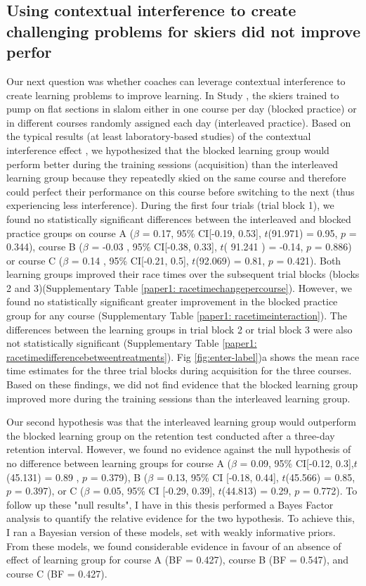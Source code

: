 \subsection{Using contextual interference to create challenging problems for skiers did not improve perfor}
Our next question was whether coaches can leverage contextual interference to create learning problems to improve learning. In Study , the skiers trained to pump on flat sections in slalom either in one course per day (blocked practice) or in different courses randomly assigned each day (interleaved practice). Based on the typical results (at least laboratory-based studies) of the contextual interference effect \cite{simon_metacognition_2001, shea_context_1983, hall_contextual_1994, shea_contextual_1979, tsutsui_contextual_1998, thomas_using_2021}, we hypothesized that the blocked learning group would perform better during the training sessions (acquisition) than the interleaved learning group because they repeatedly skied on the same course and therefore could perfect their performance on this course before switching to the next (thus experiencing less interference). During the first four trials (trial block 1), we found no statistically significant differences between the interleaved and blocked practice groups on course A ($\beta$ = 0.17, 95\% CI[-0.19, 0.53], $t$(91.971) = 0.95, $p$ =  0.344), course B ($\beta$ = -0.03 , 95\% CI[-0.38, 0.33], $t$( 91.241 ) = -0.14, $p$ = 0.886) or course C ($\beta$ = 0.14 , 95\% CI[-0.21, 0.5], $t$(92.069) = 0.81, $p$ = 0.421). Both learning groups improved their race times over the subsequent trial blocks (blocks 2 and 3)(Supplementary Table \ref{paper1: racetimechangepercourse}). However, we found no statistically significant greater improvement in the blocked practice group for any course (Supplementary Table \ref{paper1: racetimeinteraction}). The differences between the learning groups in trial block 2 or trial block 3 were also not statistically significant (Supplementary Table \ref{paper1: racetimedifferencebetweentreatments}). Fig \ref{fig:enter-label})a shows the mean race time estimates for the three trial blocks during acquisition for the three courses. Based on these findings, we did not find evidence that the blocked learning group improved more during the training sessions than the interleaved learning group. 

Our second hypothesis was that the interleaved learning group would outperform the blocked learning group on the retention test conducted after a three-day retention interval. However, we found no evidence against the null hypothesis of no difference between learning groups for course A ($\beta$ = 0.09, 95\% CI[-0.12, 0.3],$t$(45.131) = 0.89 , $p$ = 0.379), B ($\beta$ = 0.13, 95\% CI [-0.18, 0.44], $t$(45.566) = 0.85, $p$ = 0.397), or C ($\beta$ = 0.05, 95\% CI [-0.29, 0.39], $t$(44.813) = 0.29, $p$ = 0.772). To follow up these "null results", I have in this thesis performed a Bayes Factor analysis to quantify the relative evidence for the two hypothesis. To achieve this, I ran a Bayesian version of these models, set with weakly informative priors. From these models, we found considerable evidence in favour of an absence of effect of learning group for course A (BF = 0.427), course B (BF = 0.547), and course C (BF = 0.427). 


